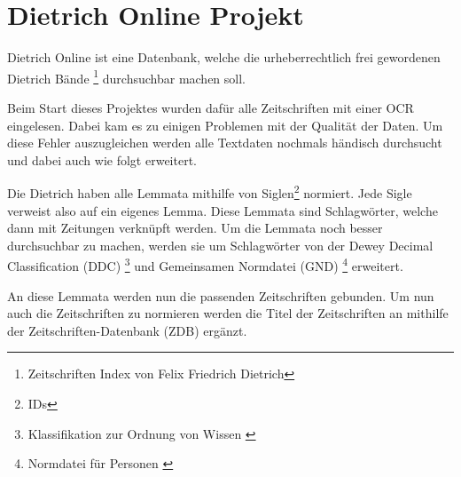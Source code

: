 \chapter{Dietrich Online Projekt}
\label{dietrichonline}

Dietrich Online ist eine Datenbank, welche die urheberrechtlich frei gewordenen Dietrich Bände \footnote{Zeitschriften Index von Felix Friedrich Dietrich} durchsuchbar machen soll. 

Beim Start dieses Projektes wurden dafür alle Zeitschriften mit einer OCR eingelesen. Dabei kam es zu einigen Problemen mit der Qualität der Daten. Um diese Fehler auszugleichen werden alle Textdaten nochmals händisch durchsucht und dabei auch wie folgt erweitert.

Die Dietrich haben alle Lemmata mithilfe von Siglen\footnote{IDs} normiert. Jede Sigle verweist also auf ein eigenes Lemma. Diese Lemmata sind Schlagwörter, welche dann mit Zeitungen verknüpft werden. Um die Lemmata noch besser durchsuchbar zu machen, werden sie um Schlagwörter von der Dewey Decimal Classification (DDC)  \footnote{Klassifikation zur Ordnung von Wissen \cite{DeutscheNationalBibliothek.ddc}} und Gemeinsamen Normdatei (GND)  \footnote{Normdatei für Personen \cite{DeutscheNationalBibliothek.2019b}}
erweitert.

An diese Lemmata werden nun die passenden Zeitschriften gebunden. Um nun auch die Zeitschriften zu normieren werden die Titel der Zeitschriften an mithilfe der Zeitschriften-Datenbank (ZDB) ergänzt. 

\cite{UniversityofTrier.2016}